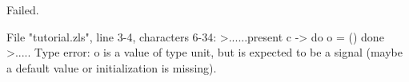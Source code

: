\chklistingfalse
{}
\begin{ChkListingMsg}
Failed.
\end{ChkListingMsg}
\begin{ChkListingErr}
File "tutorial.zls", line 3-4, characters 6-34:
>......present c -> do o = () done
>.....
Type error: o is a value of type
unit,
but is expected to be a signal (maybe a default value or initialization is missing).
\end{ChkListingErr}
